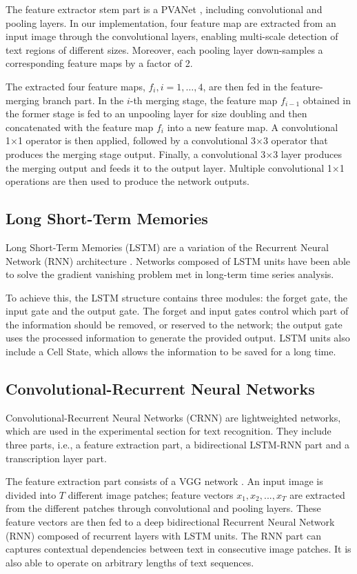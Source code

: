 \documentclass[journal,article,accept,moreauthors,pdftex]{Definitions/mdpi}
\begin{document}
The feature extractor stem part is  
a PVANet \cite{ref102}, including convolutional
and pooling layers. In our implementation, four feature map are extracted from an input image through the convolutional layers, enabling multi-scale detection
of text regions of different sizes. Moreover, each pooling layer down-samples a corresponding feature
maps by a factor of 2.

The extracted four feature maps, $f_{i}, i=1,\ldots,4$,
are then fed in the feature-merging branch part.  
In the $i$-th merging stage, the feature map
$f_{i-1}$ obtained in the former stage is fed to an unpooling
layer for size doubling and then concatenated
with the feature map $f_{i}$ into a new feature map. A
convolutional 1×1 operator is then applied, followed by a convolutional 3×3 operator that produces the merging stage output. 
Finally, a convolutional 3×3 layer produces the merging output and feeds it to the
output layer.
Multiple convolutional 1×1 operations are then used to produce the network outputs.

\subsection{Long Short-Term Memories}

Long Short-Term Memories (LSTM) are a variation of the Recurrent Neural
Network (RNN) architecture \cite{ref15}. Networks composed of LSTM units have been able to solve the gradient
vanishing problem met in long-term time series analysis. 

To achieve this, the LSTM structure
contains three modules: the forget gate, the input gate and the output gate.
The forget and input gates control which part of the information should be removed, or
reserved to the network; the output gate uses the processed information
to generate the provided output. LSTM units also include a Cell State, which allows
the information to be saved for a long time. 

\subsection{Convolutional-Recurrent Neural Networks}

Convolutional-Recurrent Neural Networks (CRNN) are lightweighted networks, which are used in the experimental section
for text recognition. They include three
parts, i.e., a feature extraction part, a  bidirectional
LSTM-RNN part and a transcription layer part.

The feature extraction part consists of a VGG network \cite{ref103}. An input image is divided into $T$ different image
patches; feature vectors $x_{1}, x_{2}, . . . , x_{T}$ are extracted from  
the different patches through convolutional and pooling
layers. These feature vectors
are then fed to a deep
bidirectional Recurrent Neural Network (RNN) composed of recurrent layers with LSTM units. The RNN part can
 captures contextual
dependencies between text in consecutive
image patches. It is also able to operate on arbitrary lengths of text
sequences.
\end{document}
